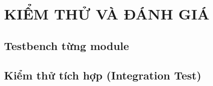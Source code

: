 \section{KIỂM THỬ VÀ ĐÁNH GIÁ}

\subsection{Testbench từng module}


\subsection{Kiểm thử tích hợp (Integration Test)}


